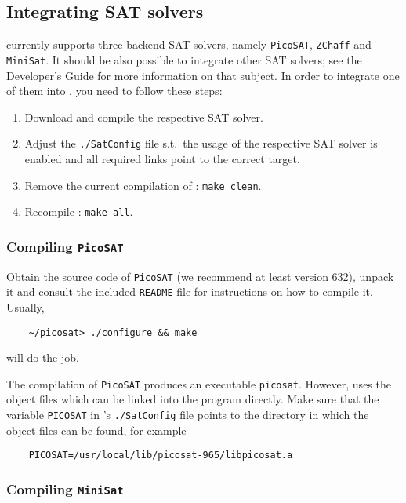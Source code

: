 \subsection{Integrating SAT solvers}

\pgsolver currently supports three backend SAT solvers, namely \texttt{PicoSAT},
\texttt{ZChaff} and \texttt{MiniSat}. It should be also possible to integrate
other SAT solvers; see the Developer's Guide for more information on that subject. In order to integrate one of them into \pgsolver, you need to follow these
steps:
\begin{enumerate}
\item Download and compile the respective SAT solver.
\item Adjust the \texttt{./SatConfig} file s.t.\ the usage of the respective
SAT solver is enabled and all required links point to the correct target.
\item Remove the current compilation of \pgsolver: \verb#make clean#.
\item Recompile \pgsolver: \verb#make all#.
\end{enumerate}


\subsubsection{Compiling \texttt{PicoSAT}}

Obtain the source code of \texttt{PicoSAT} (we recommend at least version 632), unpack it and
consult the included \texttt{README} file for instructions on how to compile it. Usually,
\begin{verbatim}
    ~/picosat> ./configure && make
\end{verbatim}
will do the job.

The compilation of \texttt{PicoSAT} produces an executable \texttt{picosat}. However, \pgsolver uses the
object files which can be linked into the program directly. Make sure that the variable
\verb#PICOSAT# in \pgsolver's \texttt{./SatConfig} file points to the directory
in which the object files can be found, for example
\begin{verbatim}
    PICOSAT=/usr/local/lib/picosat-965/libpicosat.a
\end{verbatim}


\subsubsection{Compiling \texttt{MiniSat}}

